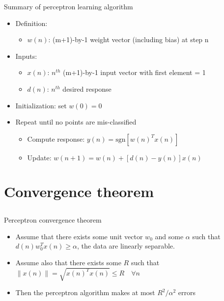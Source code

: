 \documentclass[notes]{beamer}
\providecommand{\tightlist}{%
  \setlength{\itemsep}{0pt}\setlength{\parskip}{0pt}}
\begin{document}
\begin{frame}{Summary of perceptron learning algorithm}

\begin{itemize}
\tightlist
\item
  Definition:

  \begin{itemize}
  \tightlist
  \item
    \(w(n)\): (m+1)-by-1 weight vector (including bias) at step n
  \end{itemize}
\item
  Inputs:

  \begin{itemize}
  \tightlist
  \item
    \(x(n)\): \(n^{th}\) (m+1)-by-1 input vector with first element = 1
  \item
    \(d(n)\): \(n^{th}\) desired response
  \end{itemize}
\item
  Initialization: set \(w(0)=0\)
\item
  Repeat until no points are mis-classified

  \begin{itemize}
  \tightlist
  \item
    Compute response: \(y(n)=\mathrm{sgn}\left[w(n)^T x(n) \right]\)
  \item
    Update: \(w(n+1)=w(n) + \left[d(n) -y(n) \right]x(n)\)
  \end{itemize}
\end{itemize}

\end{frame}

\section{Convergence theorem}\label{convergence-theorem}

\subsection{}\label{section-2}

\begin{frame}{Perceptron convergence theorem}

\begin{itemize}
\tightlist
\item
  Assume that there exists some unit vector \(w_0\) and some \(\alpha\)
  such that \(d(n)w_0^Tx(n)\ge \alpha\), \ie the data are linearly
  separable.
\item
  Assume also that there exists some \(R\) such that
  \(\|x(n)\|=\sqrt{x(n)^Tx(n)} \le R \quad \forall n\)\\
\item
  Then the perceptron algorithm makes at most \(R^2/\alpha^2\) errors
\end{itemize}

\end{frame}
\end{document}
